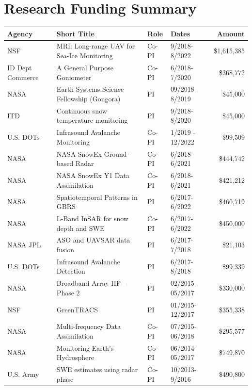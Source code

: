 \documentclass[11pt]{article}
\renewcommand\arraystretch{1}
\begin{document}
\clearpage

\begin{table}[!htbp]
\section*{Research Funding Summary}
\renewcommand\arraystretch{0.7}
  \centering
  \begin{tabular}{|l|l|l|l|r|}
\hline
\textbf{Agency} & \textbf{Short Title} & \textbf{Role} & \textbf{Dates} & \textbf{Amount} \\ \hline \hline
NSF & MRI: Long-range UAV for Sea-Ice Monitoring & Co-PI & 9/2018-8/2022 & \$1,615,385 \\ \hline
ID Dept Commerce & A General Purpose Goniometer & Co-PI & 6/2018-7/2020 & \$368,772 \\ \hline
NASA & Earth Systems Science Fellowship (Gongora) & PI & 09/2018-8/2019 & \$45,000 \\ \hline
ITD & Continuous snow temperature monitoring & PI & 9/2018-8/2020 & \$45,000 \\ \hline
U.S. DOTs & Infrasound Avalanche Monitoring & Co-PI & 1/2019 - 12/2022 & \$99,509 \\ \hline
NASA & NASA SnowEx Ground-based Radar & Co-PI & 6/2018-6/2021 &  \$444,742 \\ \hline
NASA & NASA SnowEx Y1 Data Assimilation & Co-PI & 6/2018-6/2021 &  \$421,212 \\ \hline
NASA & Spatiotemporal Patterns in GBRS & PI & 6/2017-6/2022 & \$460,719 \\ \hline
NASA & L-Band InSAR for snow depth and SWE & Co-PI & 6/2017-6/2022 & \$450,000 \\ \hline
NASA JPL & ASO and UAVSAR data fusion & PI &  6/2017-7/2018 & \$21,103 \\ \hline
U.S. DOTs & Infrasound Avalanche Detection & PI & 6/2017-8/2018 &  \$99,339 \\ \hline
NASA & Broadband Array IIP - Phase 2 & PI & 02/2015-05/2017 & \$330,000 \\ \hline
NSF & GreenTRACS & PI & 01/2015-12/2017 & \$355,338 \\ \hline
NASA & Multi-frequency Data Assimilation & Co-PI & 07/2015-06/2018 & \$295,577 \\ \hline
NASA & Monitoring Earth's Hydrosphere & Co-PI & 06/2014-05/2017 &  \$749,870  \\ \hline
U.S. Army & SWE estimates using radar phase & Co-PI & 10/2013- 9/2016 & \$490,800 \\ \hline

\end{tabular}
\end{table}
\end{document}
